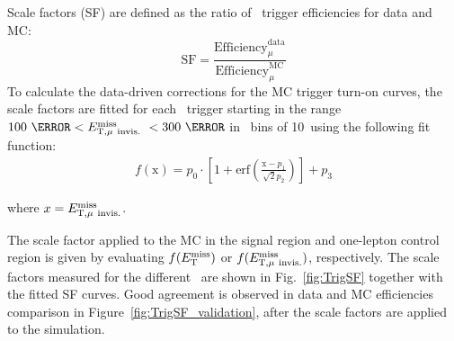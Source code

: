 \par Scale factors (SF) are defined as the ratio of \MET~trigger efficiencies for data and MC:
\begin{equation}
\label{eq:dataMCsf}
\text{SF} = \frac{\text{Efficiency}^{\text{data}}_{\mu}}{\text{Efficiency}^{\text{MC}}_{\mu}}
\end{equation}
To calculate the data-driven corrections for the MC trigger turn-on curves, the scale factors are fitted for each \MET~trigger starting in the range $100~\GeV < \METnomu~< 300~\GeV$ in \MET~bins of 10~\GeV using the following fit function:
\begin{eqnarray}
\label{eq:dataMCsf_fit}
f\left(\text{x}\right) = p_0 \cdot \left[1 + \text{erf}\left(\frac{\text{x} - p_{1}}{\sqrt{2}p_{2}}\right)\right] + p_3
\end{eqnarray}

where $x = E_{\mathrm{T, \mu~invis.}}^{\mathrm{miss}}$.
\par The scale factor applied to the MC in the signal region and one-lepton control region is given by evaluating $f(E_{\mathrm{T}}^{\mathrm{miss}})$ or $f(E_{\mathrm{T, \mu~invis.}}^{\mathrm{miss}})$,
 respectively. The scale factors measured for the different \MET~are shown in Fig.~\ref{fig:TrigSF} together with the fitted SF curves.
 Good agreement is observed in data and MC efficiencies comparison in Figure~\ref{fig:TrigSF_validation}, after the scale factors are applied to the simulation.

